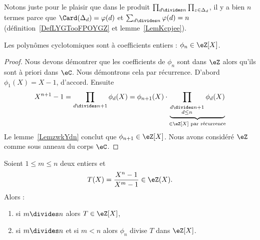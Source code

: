 \begin{remark}
	Notons juste pour le plaisir que dans le produit \( \prod_{d\divides n}\prod_{z\in\Delta_d}\), il y a bien \( n\) termes parce que \( \Card(\Delta_d)=\varphi(d)\) et \( \sum_{d\divides n}\varphi(d)=n\) (définition~\ref{DefLYGTooFPOYGZ} et lemme~\ref{LemKcpjee}).
\end{remark}

\begin{proposition}
	Les polynômes cyclotomiques sont à coefficients entiers : \( \phi_n\in \eZ[X]\).
\end{proposition}

\begin{proof}
	Nous devons démontrer que les coefficients de \( \phi_n\) sont dans \( \eZ\) alors qu'ils sont à priori dans \( \eC\). Nous démontrons cela par récurrence. D'abord \( \phi_1(X)=X-1\), d'accord. Ensuite
	\begin{equation}
		X^{n+1}-1=\prod_{d\divides n+1}\phi_d(X)=\phi_{n+1}(X)\cdot\underbrace{\prod_{_{\substack{d\divides n+1\\d\leq n}}}\phi_d(X)}_{\in\eZ[X]\text{ par récurrence}}
	\end{equation}
	Le lemme~\ref{LemzwkYdn} conclut que \( \phi_{n+1}\in \eZ[X]\). Nous avons considéré \( \eZ\) comme sous anneau du corps \( \eC\).
\end{proof}

\begin{proposition}     \label{PropUImYnL}
	Soient \( 1\leq m\leq n\) deux entiers et
	\begin{equation}
		T(X)=\frac{ X^n-1 }{ X^m-1 }\in \eZ(X).
	\end{equation}
	Alors :
	\begin{enumerate}
		\item   \label{ItemhpDPKE}
		      si \( m\divides n\) alors \( T\in \eZ[X]\),
		\item
		      si \( m\divides n\) et si \( m<n\) alors \( \phi_n\) divise \( T\) dans \( \eZ[X]\).
	\end{enumerate}
\end{proposition}

